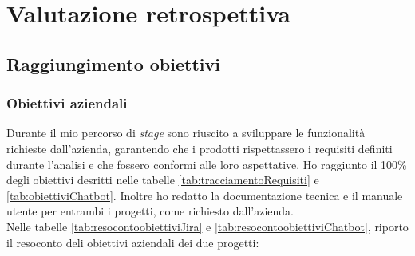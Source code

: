\chapter{Valutazione retrospettiva}
\label{cap:conclusioni}

\section{Raggiungimento obiettivi}
\subsection{Obiettivi aziendali}
Durante il mio percorso di \textit{stage} sono riuscito a sviluppare le funzionalità richieste dall'azienda, garantendo che i prodotti rispettassero i requisiti definiti durante l'analisi e che fossero conformi alle loro aspettative.
Ho raggiunto il 100\% degli obiettivi desritti nelle tabelle \ref{tab:tracciamentoRequisiti} e \ref{tab:obiettiviChatbot}. Inoltre ho redatto la documentazione tecnica e il manuale utente per entrambi i progetti, come richiesto dall'azienda.\\
Nelle tabelle \ref{tab:resocontoobiettiviJira} e \ref{tab:resocontoobiettiviChatbot}, riporto il resoconto deli obiettivi aziendali dei due progetti:

